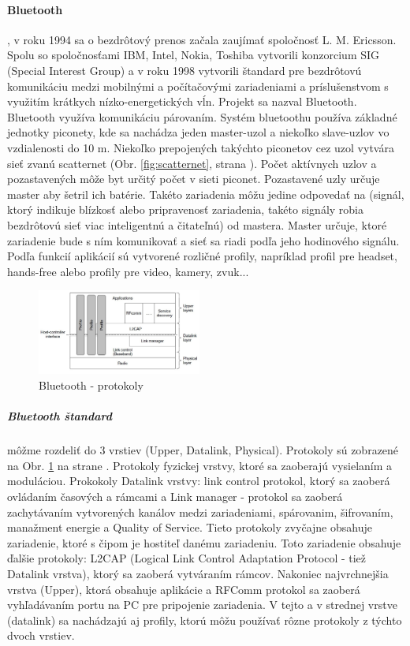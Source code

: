 \documentclass[../../main.tex]{subfiles}
\begin{document}
\paragraph{Bluetooth},
v roku 1994 sa o bezdrôtový prenos začala zaujímať spoločnosť L. M. Ericsson. Spolu so spoločnosťami IBM, Intel, Nokia, Toshiba vytvorili konzorcium SIG (Special Interest
Group) a v roku 1998 vytvorili štandard pre bezdrôtovú komunikáciu medzi mobilnými a počítačovými zariadeniami a príslušenstvom s využitím krátkych nízko-energetických vĺn. Projekt sa nazval Bluetooth. Bluetooth využíva komunikáciu párovaním. Systém bluetoothu používa základné jednotky piconety, kde sa nachádza jeden master-uzol a niekoľko slave-uzlov vo vzdialenosti do 10 m. Niekoľko prepojených takýchto piconetov cez  uzol vytvára sieť zvanú scatternet (Obr. \ref{fig:scatternet}, strana \pageref{fig:scatternet}). Počet aktívnych uzlov a pozastavených môže byt určitý počet v sieti piconet. Pozastavené  uzly určuje master aby šetril ich batérie. Takéto zariadenia môžu jedine odpovedať na (signál, ktorý indikuje blízkosť alebo pripravenosť zariadenia, takéto signály robia bezdrôtovú sieť viac inteligentnú a čitateľnú\cite{beacon_signal}) od mastera. Master určuje, ktoré zariadenie bude s ním komunikovať a sieť sa riadi podľa jeho hodinového signálu. Podľa funkcií aplikácií sú vytvorené rozličné profily, napríklad profil pre headset, hands-free alebo profily pre video, kamery, zvuk...
 \begin{figure}
    \centering
  \includegraphics[width=0.48\textwidth]{images/bluetooth_stack.jpg}
  \caption{Bluetooth - protokoly\cite{tanenbaum}}
    \label{fig:bluetooth_stack}
\end{figure} 
\subparagraph{Bluetooth štandard} môžme rozdeliť do 3 vrstiev (Upper, Datalink, Physical). Protokoly sú zobrazené na Obr. \ref{fig:bluetooth_stack} na strane \pageref{fig:bluetooth_stack}. Protokoly fyzickej vrstvy, ktoré sa zaoberajú vysielaním a moduláciou. Prokokoly Datalink vrstvy: link control protokol, ktorý sa zaoberá ovládaním časových  a rámcami a Link manager - protokol sa zaoberá zachytávaním vytvorených kanálov medzi zariadeniami, spárovanim, šifrovaním, manažment energie a Quality of Service. Tieto protokoly zvyčajne obsahuje zariadenie, ktoré s čipom je hostiteľ danému zariadeniu. Toto zariadenie obsahuje ďalšie protokoly:
L2CAP (Logical Link Control Adaptation
Protocol - tiež Datalink vrstva), ktorý sa zaoberá vytváraním rámcov. Nakoniec najvrchnejšia vrstva (Upper), ktorá obsahuje aplikácie a RFComm protokol sa zaoberá vyhľadávaním portu na PC pre pripojenie zariadenia. V tejto a v strednej vrstve (datalink) sa nachádzajú aj profily, ktorú môžu používať rôzne protokoly z týchto dvoch vrstiev. 
\end{document}

